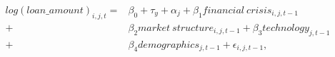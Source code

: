 \begin{equation}\begin{split}
log(loan\_amount)_{i,j,t} = & \beta_0 + \tau_{y} + \alpha_{j} + \beta_1 financial\ crisis_{i,j,t-1} \\ 
+ &  \beta_2 market\ structure_{i,j,t-1} + \beta_3 technology_{j,t-1}\\ 
+ &  \beta_4 demographics_{j,t-1} +\epsilon_{i,j,t-1},
     \end{split}\end{equation}
